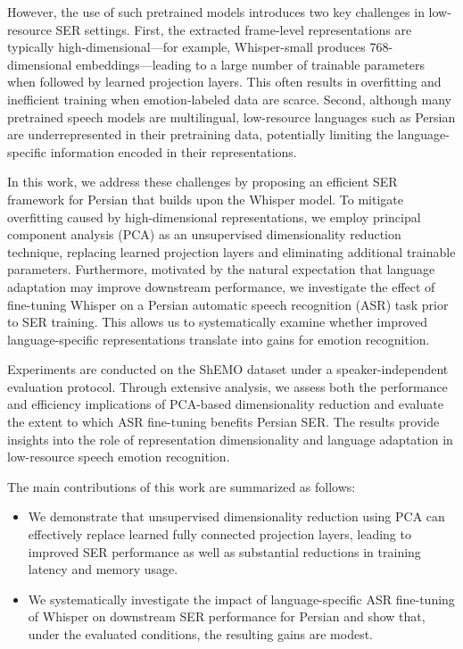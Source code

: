 \documentclass[conference]{IEEEtran}
\begin{document}
However, the use of such pretrained models introduces two key challenges in low-resource SER settings. First, the extracted frame-level representations are typically high-dimensional—for example, Whisper-small produces 768-dimensional embeddings—leading to a large number of trainable parameters when followed by learned projection layers. This often results in overfitting and inefficient training when emotion-labeled data are scarce. Second, although many pretrained speech models are multilingual, low-resource languages such as Persian are underrepresented in their pretraining data, potentially limiting the language-specific information encoded in their representations.

In this work, we address these challenges by proposing an efficient SER framework for Persian that builds upon the Whisper model. To mitigate overfitting caused by high-dimensional representations, we employ principal component analysis (PCA) as an unsupervised dimensionality reduction technique, replacing learned projection layers and eliminating additional trainable parameters. Furthermore, motivated by the natural expectation that language adaptation may improve downstream performance, we investigate the effect of fine-tuning Whisper on a Persian automatic speech recognition (ASR) task prior to SER training. This allows us to systematically examine whether improved language-specific representations translate into gains for emotion recognition.

Experiments are conducted on the ShEMO dataset under a speaker-independent evaluation protocol. Through extensive analysis, we assess both the performance and efficiency implications of PCA-based dimensionality reduction and evaluate the extent to which ASR fine-tuning benefits Persian SER. The results provide insights into the role of representation dimensionality and language adaptation in low-resource speech emotion recognition.

The main contributions of this work are summarized as follows:
\begin{itemize}
\item We demonstrate that unsupervised dimensionality reduction using PCA can effectively replace learned fully connected projection layers, leading to improved SER performance as well as substantial reductions in training latency and memory usage.

\item We systematically investigate the impact of language-specific ASR fine-tuning of Whisper on downstream SER performance for Persian and show that, under the evaluated conditions, the resulting gains are modest.
\end{itemize}
\end{document}
